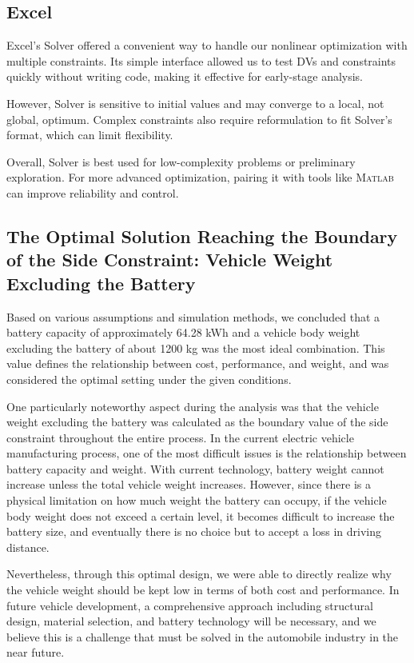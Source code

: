 \documentclass[11pt,twocolumn]{article}
\begin{document}
        \subsection{Excel}
            Excel's Solver offered a convenient way to handle our nonlinear optimization with multiple constraints.
            Its simple interface allowed us to test DVs and constraints quickly without writing code, making it effective for early-stage analysis.
            \par
            However, Solver is sensitive to initial values and may converge to a local, not global, optimum.
            Complex constraints also require reformulation to fit Solver's format, which can limit flexibility.
            \par
            Overall, Solver is best used for low-complexity problems or preliminary exploration.
            For more advanced optimization, pairing it with tools like \textsc{Matlab} can improve reliability and control.
        \subsection{The Optimal Solution Reaching the Boundary of the Side Constraint: Vehicle Weight Excluding the Battery}
            Based on various assumptions and simulation methods, we concluded that a battery capacity of approximately 64.28 kWh and a vehicle body weight excluding the battery of about 1200 kg was the most ideal combination.
            This value defines the relationship between cost, performance, and weight, and was considered the optimal setting under the given conditions.
            \par
            One particularly noteworthy aspect during the analysis was that the vehicle weight excluding the battery was calculated as the boundary value of the side constraint throughout the entire process.
            In the current electric vehicle manufacturing process, one of the most difficult issues is the relationship between battery capacity and weight.
            With current technology, battery weight cannot increase unless the total vehicle weight increases.
            However, since there is a physical limitation on how much weight the battery can occupy, if the vehicle body weight does not exceed a certain level, it becomes difficult to increase the battery size, and eventually there is no choice but to accept a loss in driving distance.
            \par
            Nevertheless, through this optimal design, we were able to directly realize why the vehicle weight should be kept low in terms of both cost and performance.
            In future vehicle development, a comprehensive approach including structural design, material selection, and battery technology will be necessary, and we believe this is a challenge that must be solved in the automobile industry in the near future.
\end{document}
